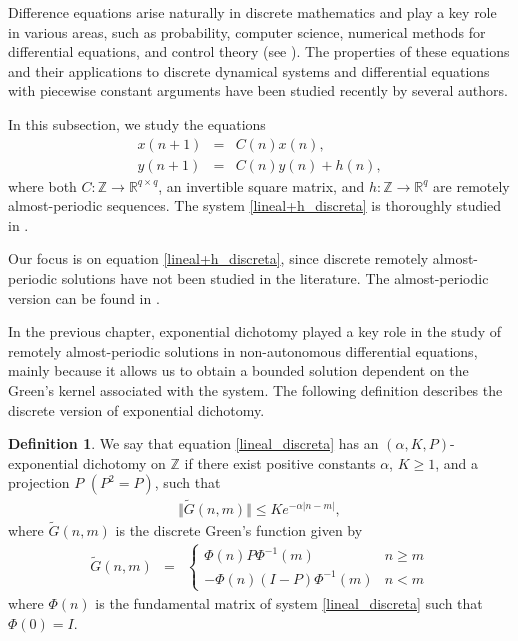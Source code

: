 \documentclass[english,,reqno]{amsart}
\numberwithin{equation}{section}
\theoremstyle{plain}
\theoremstyle{definition}
\newtheorem{defn}{Definition}[section]
\theoremstyle{remark}
\begin{document}
Difference equations arise naturally in discrete mathematics and play a key role in various areas,  
such as probability, computer science, numerical methods for differential equations,  
and control theory (see \cite{agarwal,lakshmikantham,papaschinopoulos_2}).  
The properties of these equations and their applications to discrete dynamical systems and differential equations  
with piecewise constant arguments have been studied recently by several authors.  

In this subsection, we study the equations  
\begin{eqnarray}
x(n+1) &=& C(n)x(n), \label{lineal_discreta} \\
y(n+1) &=& C(n)y(n) + h(n), \label{lineal+h_discreta}
\end{eqnarray}  
where both $C:\mathbb{Z} \rightarrow \mathbb{R}^{q\times q}$, an invertible square matrix,  
and $h:\mathbb{Z} \rightarrow \mathbb{R}^q$ are remotely almost-periodic sequences.  
The system \eqref{lineal+h_discreta} is thoroughly studied in \cite{jialin}.

Our focus is on equation \eqref{lineal+h_discreta}, since discrete remotely almost-periodic solutions have not been studied in the literature.  
The almost-periodic version can be found in \cite{zhang_APTE}.  

In the previous chapter, exponential dichotomy played a key role in the study of remotely almost-periodic solutions in non-autonomous differential equations,  
mainly because it allows us to obtain a bounded solution dependent on the Green's kernel associated with the system.  
The following definition describes the discrete version of exponential dichotomy.  

\begin{defn}
We say that equation \eqref{lineal_discreta} has an $(\alpha, K, P)$-exponential dichotomy on $\mathbb{Z}$ if there exist positive constants $\alpha$, $K \geq 1$, and a projection $P$ $(P^2 = P)$, such that
\begin{eqnarray*}
\Vert \tilde{G}(n,m) \Vert \leq Ke^{-\alpha \vert n-m \vert},
\end{eqnarray*}
where $\tilde{G}(n,m)$ is the discrete Green's function given by
\begin{eqnarray*}
\tilde{G}(n,m)&=&\begin{cases}
\Phi\left(n\right)P\Phi^{-1}\left(m\right) & n\geq m\\
-\Phi\left(n\right)\left(I-P\right)\Phi^{-1}\left(m\right) & n< m
\end{cases}
\end{eqnarray*}
where $\Phi(n)$ is the fundamental matrix of system \eqref{lineal_discreta} such that $\Phi(0) = I$.
\end{defn}
\end{document}
